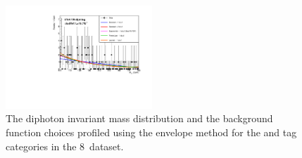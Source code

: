 \begin{figure}
  \includegraphics[width=0.49\textwidth]{analysis/plots/multipdf_plots/cat13_8TeV.pdf}
  \caption{The diphoton invariant mass distribution and the background function choices profiled using the envelope method for the \VH and \ttH tag categories in the 8~\TeV dataset.}
  \label{fig:multipdf4}
\end{figure}

